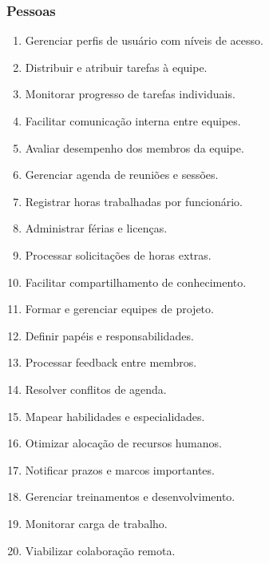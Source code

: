 \subsubsection{Pessoas}
\begin{enumerate}
  \item Gerenciar perfis de usuário com níveis de acesso.
  \item Distribuir e atribuir tarefas à equipe.
  \item Monitorar progresso de tarefas individuais.
  \item Facilitar comunicação interna entre equipes.
  \item Avaliar desempenho dos membros da equipe.
  \item Gerenciar agenda de reuniões e sessões.
  \item Registrar horas trabalhadas por funcionário.
  \item Administrar férias e licenças.
  \item Processar solicitações de horas extras.
  \item Facilitar compartilhamento de conhecimento.
  \item Formar e gerenciar equipes de projeto.
  \item Definir papéis e responsabilidades.
  \item Processar feedback entre membros.
  \item Resolver conflitos de agenda.
  \item Mapear habilidades e especialidades.
  \item Otimizar alocação de recursos humanos.
  \item Notificar prazos e marcos importantes.
  \item Gerenciar treinamentos e desenvolvimento.
  \item Monitorar carga de trabalho.
  \item Viabilizar colaboração remota.
\end{enumerate}


